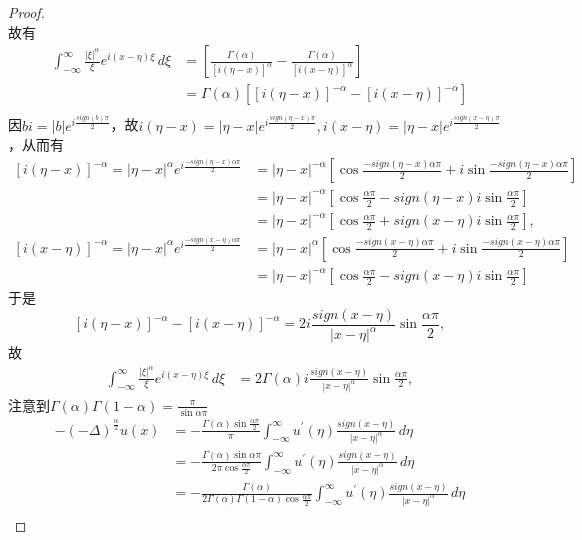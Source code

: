 \begin{proof}
$$$$
故有
$$
\begin{aligned}
\int_{-\infty}^\infty\frac{|\xi|^\alpha}\xi   e^{i(x-\eta)\xi}\,d\xi &= \left[\frac{\Gamma(\alpha)}{[i(\eta-x)]^\alpha} - \frac{\Gamma(\alpha)}{[i(x-\eta)]^\alpha}\right]\\
&= \Gamma(\alpha)\left[[i(\eta-x)]^{-\alpha} - [i(x-\eta)]^{-\alpha}\right]\\
\end{aligned}
$$
因$bi=|b|e^{i\frac{sign(b) \pi}2}$，故$i(\eta-x)=|\eta-x|e^{ i\frac{sign(\eta-x)\pi}2}, i(x-\eta)=|\eta-x|e^{i\frac{sign(x-\eta)\pi}2}$，从而有
$$
\begin{aligned} 
\left[i(\eta-x)\right]^{-\alpha}=|\eta-x|^\alpha e^{i\frac{-sign(\eta-x)\alpha\pi}2}&=|\eta-x|^{-\alpha}\left[ \cos \frac{-sign(\eta-x)\alpha\pi}2+i\sin \frac{-sign(\eta-x)\alpha\pi}2 \right] \\
&=|\eta-x|^{-\alpha}\left[ \cos \frac{\alpha\pi}2-sign(\eta-x)i\sin \frac{\alpha\pi}2 \right]\\
&=|\eta-x|^{-\alpha}\left[ \cos \frac{\alpha\pi}2+sign(x-\eta)i\sin \frac{\alpha\pi}2 \right], \\
\left[i(x-\eta)\right]^{-\alpha}=|\eta-x|^\alpha e^{i\frac{-sign(x-\eta)\alpha\pi}2}&=|\eta-x|^\alpha\left[ \cos \frac{-sign(x-\eta)\alpha\pi}2+i\sin \frac{-sign(x-\eta)\alpha\pi}2 \right]\\
&=|\eta-x|^{-\alpha}\left[ \cos \frac{\alpha\pi}2-sign(x-\eta)i\sin \frac{\alpha\pi}2 \right]
\end{aligned}
$$
于是
$$
[i(\eta-x)]^{-\alpha} - [i(x-\eta)]^{-\alpha}=2i \frac{sign(x-\eta)}{|x-\eta|^\alpha}\sin\frac{\alpha\pi}2,
$$
故
$$
\begin{aligned}
\int_{-\infty}^\infty\frac{|\xi|^\alpha}\xi   e^{i(x-\eta)\xi}\,d\xi &= 2\Gamma(\alpha)i   \frac{sign(x-\eta)}{|x-\eta|^\alpha}\sin\frac{\alpha\pi}2,
\end{aligned}
$$
注意到$\Gamma(\alpha)\Gamma(1-\alpha)=\frac{\pi}{\sin\alpha\pi}$
$$
\begin{aligned}
-(-\Delta)^{\frac\alpha2}u(x)&=-\frac{\Gamma(\alpha)\sin\frac{\alpha\pi}2}{\pi}\int_{-\infty}^\infty u^\prime(\eta)\frac{sign(x-\eta)}{|x-\eta|^\alpha}   \,d\eta\\
&=-\frac{\Gamma(\alpha)\sin \alpha\pi}{2\pi\cos\frac{\alpha\pi}2}\int_{-\infty}^\infty u^\prime(\eta)\frac{sign(x-\eta)}{|x-\eta|^\alpha}   \,d\eta\\
&=-\frac{\Gamma(\alpha)}{2\Gamma(\alpha)\Gamma(1-\alpha)\cos\frac{\alpha\pi}2}\int_{-\infty}^\infty u^\prime(\eta)\frac{sign(x-\eta)}{|x-\eta|^\alpha}   \,d\eta\\

\end{aligned}$$
\end{proof}
